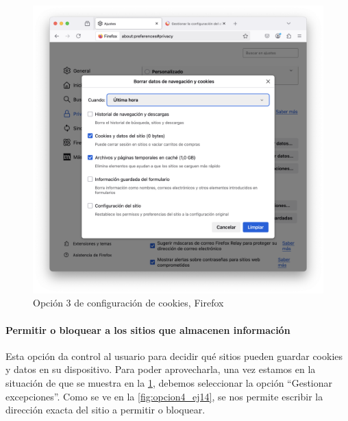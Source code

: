 \begin{figure}[H]   
    \includegraphics[width=\textwidth]{opcion3_ej14.png}
    \caption{Opción 3 de configuración de cookies, Firefox}
    \label{fig:opcion3_ej14}
\end{figure}

\paragraph{Permitir o bloquear a los sitios que almacenen información }

Esta opción da control al usuario para decidir qué sitios pueden guardar cookies y datos en su dispositivo. Para poder aprovecharla, una vez estamos en la situación de que se muestra en la \ref{fig:opcion3_ej14}, debemos seleccionar la opción “Gestionar excepciones”. Como se ve en la \ref{fig:opcion4_ej14}, se nos permite escribir la dirección exacta del sitio a permitir o bloquear. 

